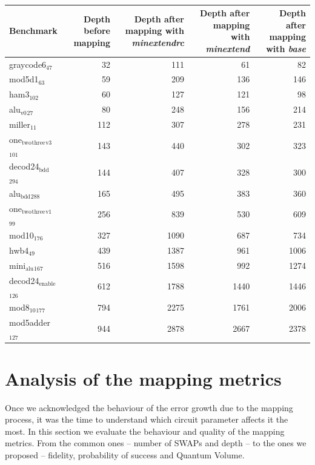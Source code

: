 \begin{table}[htbp]
\caption{\label{tab:}
}
\centering
\small
\begin{tabular}{lrrrr}
\hline
Benchmark & Depth before mapping & Depth after mapping with \emph{minextendrc} & Depth after mapping with \emph{minextend} & Depth after mapping with \emph{base}\\
\hline
graycode6\(_{\text{47}}\) & 32 & 111 & 61 & 82\\
mod5d1\(_{\text{63}}\) & 59 & 209 & 136 & 146\\
ham3\(_{\text{102}}\) & 60 & 127 & 121 & 98\\
alu\(_{\text{v0}}\)\(_{\text{27}}\) & 80 & 248 & 156 & 214\\
miller\(_{\text{11}}\) & 112 & 307 & 278 & 231\\
one\(_{\text{two}}\)\(_{\text{three}}\)\(_{\text{v3}}\)\(_{\text{101}}\) & 143 & 440 & 302 & 323\\
decod24\(_{\text{bdd}}\)\(_{\text{294}}\) & 144 & 407 & 328 & 300\\
alu\(_{\text{bdd}}\)\(_{\text{288}}\) & 165 & 495 & 383 & 360\\
one\(_{\text{two}}\)\(_{\text{three}}\)\(_{\text{v1}}\)\(_{\text{99}}\) & 256 & 839 & 530 & 609\\
mod10\(_{\text{176}}\) & 327 & 1090 & 687 & 734\\
hwb4\(_{\text{49}}\) & 439 & 1387 & 961 & 1006\\
mini\(_{\text{alu}}\)\(_{\text{167}}\) & 516 & 1598 & 992 & 1274\\
decod24\(_{\text{enable}}\)\(_{\text{126}}\) & 612 & 1788 & 1440 & 1446\\
mod8\(_{\text{10}}\)\(_{\text{177}}\) & 794 & 2275 & 1761 & 2006\\
mod5adder\(_{\text{127}}\) & 944 & 2878 & 2667 & 2378\\
\hline
\end{tabular}
\end{table}

\section{Analysis of the mapping metrics}
\label{sec:orgfee112c}
Once we acknowledged the behaviour of the error growth due to the mapping process, it was the time to understand which circuit parameter affects it the most.
In this section we evaluate the behaviour and quality of the mapping metrics.
From the common ones -- number of SWAPs and depth -- to the ones we proposed -- fidelity, probability of success and Quantum Volume.




